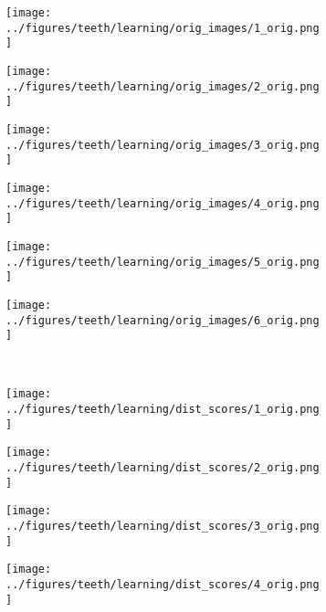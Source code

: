 \begin{figure}[h!]
	\begin{subfigure}{0.16\textwidth}
		\centering
		\texttt{[image: ../figures/teeth/learning/orig\_images/1\_orig.png]}
		\label{fig:1}
	\end{subfigure}
	\begin{subfigure}{0.16\textwidth}
		\centering
		\texttt{[image: ../figures/teeth/learning/orig\_images/2\_orig.png]}
		\label{fig:1}
	\end{subfigure}
	\begin{subfigure}{0.16\textwidth}
		\centering
		\texttt{[image: ../figures/teeth/learning/orig\_images/3\_orig.png]}
		\label{fig:1}
	\end{subfigure}
	\begin{subfigure}{0.16\textwidth}
		\centering
		\texttt{[image: ../figures/teeth/learning/orig\_images/4\_orig.png]}
		\label{fig:1}
	\end{subfigure}
	\begin{subfigure}{0.16\textwidth}
		\centering
		\texttt{[image: ../figures/teeth/learning/orig\_images/5\_orig.png]}
		\label{fig:1}
	\end{subfigure}
	\begin{subfigure}{0.16\textwidth}
		\centering
		\texttt{[image: ../figures/teeth/learning/orig\_images/6\_orig.png]}
		\label{fig:1}
	\end{subfigure}
	\vspace{-0.35cm}
	\\
	\begin{subfigure}{0.16\textwidth}
		\centering
		\texttt{[image: ../figures/teeth/learning/dist\_scores/1\_orig.png]}
		\label{fig:1}
	\end{subfigure}
	\begin{subfigure}{0.16\textwidth}
		\centering
		\texttt{[image: ../figures/teeth/learning/dist\_scores/2\_orig.png]}
		\label{fig:1}
	\end{subfigure}
	\begin{subfigure}{0.16\textwidth}
		\centering
		\texttt{[image: ../figures/teeth/learning/dist\_scores/3\_orig.png]}
		\label{fig:1}
	\end{subfigure}
	\begin{subfigure}{0.16\textwidth}
		\centering
		\texttt{[image: ../figures/teeth/learning/dist\_scores/4\_orig.png]}
		\label{fig:1}
	\end{subfigure}

\end{figure}

